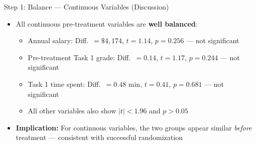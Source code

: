 \documentclass[hyperref={pdfpagelabels=false}]{beamer}
\begin{document}
	\begin{frame}{Step 1: Balance --- Continuous Variables (Discussion)}
		\begin{itemize}
			\item All continuous pre-treatment variables are \textbf{well balanced}:
			\vspace{0.3cm}
			\begin{itemize}
				\item Annual salary: Diff.\ $=\$4{,}174$, $t = 1.14$, $p = 0.256$ --- not significant
				\vspace{0.2cm}
				\item Pre-treatment Task 1 grade: Diff.\ $= 0.14$, $t = 1.17$, $p = 0.244$ --- not significant
				\vspace{0.2cm}
				\item Task 1 time spent: Diff.\ $= 0.48$ min, $t = 0.41$, $p = 0.681$ --- not significant
				\vspace{0.2cm}
				\item All other variables also show $|t| < 1.96$ and $p > 0.05$
			\end{itemize}
			\vspace{0.4cm}
			\item \textbf{Implication:} For continuous variables, the two groups appear similar \emph{before} treatment --- consistent with successful randomization
		\end{itemize}
	\end{frame}
	
\end{document}
